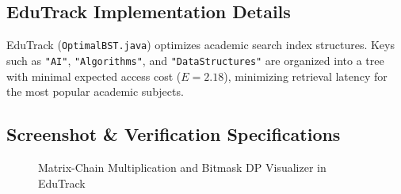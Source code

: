 \subsection{EduTrack Implementation Details}
EduTrack (\texttt{OptimalBST.java}) optimizes academic search index structures. Keys such as \texttt{"AI"}, \texttt{"Algorithms"}, and \texttt{"DataStructures"} are organized into a tree with minimal expected access cost ($E = 2.18$), minimizing retrieval latency for the most popular academic subjects.

\subsection{Screenshot \& Verification Specifications}
\begin{figure}[H]
    \centering
    \caption{Matrix-Chain Multiplication and Bitmask DP Visualizer in EduTrack}
    \label{fig:screenshot_dp_mcm_tsp}
\end{figure}
